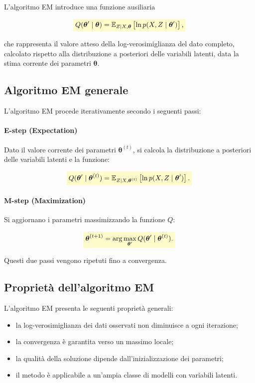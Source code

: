 \documentclass[a4paper,12pt]{report}
\newcommand{\highlight}[1]{%
\colorbox{yellow!20}{$\displaystyle #1$}%
}
\begin{document}
L’algoritmo EM introduce una funzione ausiliaria

\[
\highlight{
Q(\boldsymbol{\theta}' \mid \boldsymbol{\theta})
= \mathbb{E}_{Z \mid X, \boldsymbol{\theta}}
\left[ \ln p(X, Z \mid \boldsymbol{\theta}') \right],}
\]

che rappresenta il valore atteso della log-verosimiglianza del dato completo, calcolato rispetto alla distribuzione a posteriori delle variabili latenti, data la stima corrente dei parametri $\boldsymbol{\theta}$.

\subsection{Algoritmo EM generale}

L’algoritmo EM procede iterativamente secondo i seguenti passi:

\paragraph{E-step (Expectation)}
Dato il valore corrente dei parametri $\boldsymbol{\theta}^{(t)}$, si calcola la distribuzione a posteriori delle variabili latenti e la funzione:

\[
\highlight{
Q(\boldsymbol{\theta}' \mid \boldsymbol{\theta}^{(t)})
= \mathbb{E}_{Z \mid X, \boldsymbol{\theta}^{(t)}}
\left[ \ln p(X, Z \mid \boldsymbol{\theta}') \right].}
\]

\paragraph{M-step (Maximization)}
Si aggiornano i parametri massimizzando la funzione $Q$:

\[
\highlight{
\boldsymbol{\theta}^{(t+1)} =
\arg\max_{\boldsymbol{\theta}'} Q(\boldsymbol{\theta}' \mid \boldsymbol{\theta}^{(t)}).}
\]

Questi due passi vengono ripetuti fino a convergenza.

\subsection{Proprietà dell’algoritmo EM}

L’algoritmo EM presenta le seguenti proprietà generali:
\begin{itemize}
    \item la log-verosimiglianza dei dati osservati non diminuisce a ogni iterazione;
    \item la convergenza è garantita verso un massimo locale;
    \item la qualità della soluzione dipende dall’inizializzazione dei parametri;
    \item il metodo è applicabile a un’ampia classe di modelli con variabili latenti.
\end{itemize}
\end{document}
